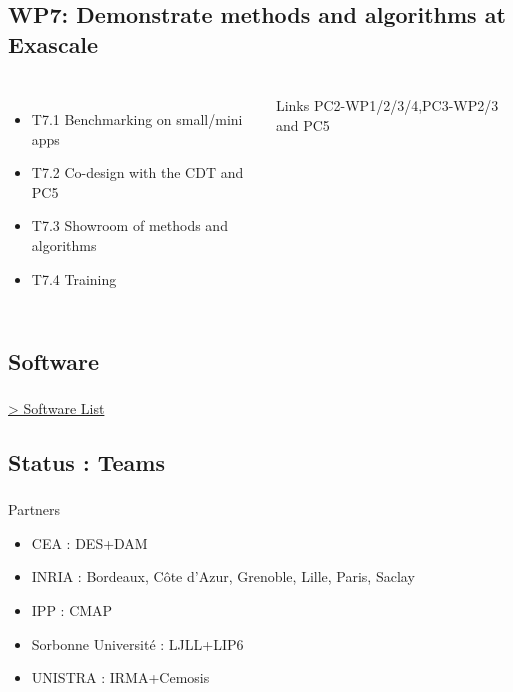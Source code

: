 \subsection{WP7: Demonstrate methods and algorithms at Exascale}
\begin{frame}
  \frametitle{\insertsectionhead}
  \framesubtitle{\insertsubsectionhead}

  \begin{columns}
    \begin{itemize}
      \item T7.1 Benchmarking on small/mini apps 
      \item T7.2 Co-design with the CDT and PC5
      \item T7.3 Showroom of methods and algorithms
      \item T7.4 Training
    \end{itemize}
    \begin{alertblock}{Links}
      PC2-WP1/2/3/4,PC3-WP2/3 and PC5
    \end{alertblock}
   
  \end{columns}
\end{frame}


\subsection{Software}
\begin{frame}
  \frametitle{\insertsectionhead}
  \framesubtitle{\insertsubsectionhead}


\href{https://docs.google.com/spreadsheets/d/19v57jpek52nQV2V0tBBON5ivGCz7Bqf3Gw-fHroVHkA/edit#gid=0}{> Software List}
  
\end{frame}

\subsection{Status : Teams}
\begin{frame}
  \frametitle{\insertsectionhead}
  \framesubtitle{\insertsubsectionhead}

  Partners
  \begin{itemize}
    \item CEA : DES+DAM
    \item INRIA : Bordeaux,  Côte d'Azur, Grenoble, Lille, Paris, Saclay
    \item IPP : CMAP 
    \item Sorbonne Université : LJLL+LIP6
    \item UNISTRA  : IRMA+Cemosis
  \end{itemize}
\end{frame}

